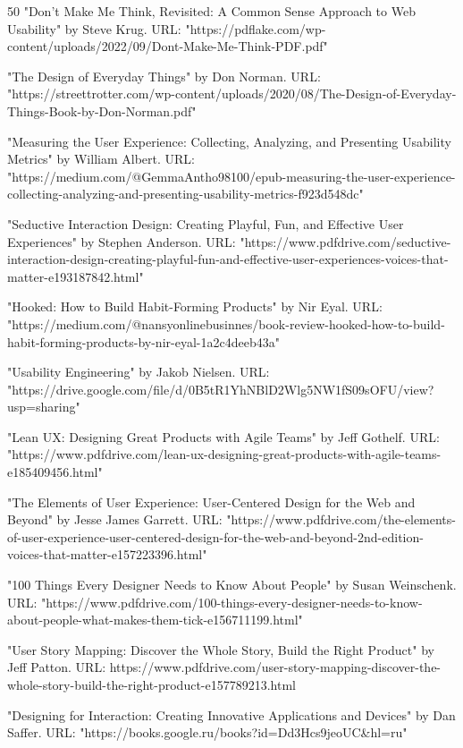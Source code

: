 \documentclass{article}
\begin{document}
\begin{thebibliography} {50}
"Don't Make Me Think, Revisited: A Common Sense Approach to Web Usability" by Steve Krug. URL:
"https://pdflake.com/wp-content/uploads/2022/09/Dont-Make-Me-Think-PDF.pdf"

"The Design of Everyday Things" by Don Norman. URL:
"https://streettrotter.com/wp-content/uploads/2020/08/The-Design-of-Everyday-Things-Book-by-Don-Norman.pdf"

"Measuring the User Experience: Collecting, Analyzing, and Presenting Usability Metrics" by William Albert. URL: "https://medium.com/@GemmaAntho98100/epub-measuring-the-user-experience-collecting-analyzing-and-presenting-usability-metrics-f923d548dc"

"Seductive Interaction Design: Creating Playful, Fun, and Effective User Experiences" by Stephen Anderson. URL: "https://www.pdfdrive.com/seductive-interaction-design-creating-playful-fun-and-effective-user-experiences-voices-that-matter-e193187842.html"

"Hooked: How to Build Habit-Forming Products" by Nir Eyal. URL: "https://medium.com/@nansyonlinebusinnes/book-review-hooked-how-to-build-habit-forming-products-by-nir-eyal-1a2c4deeb43a"

"Usability Engineering" by Jakob Nielsen. URL: "https://drive.google.com/file/d/0B5tR1YhNBlD2Wlg5NW1fS09sOFU/view?usp=sharing"

"Lean UX: Designing Great Products with Agile Teams" by Jeff Gothelf. URL:
"https://www.pdfdrive.com/lean-ux-designing-great-products-with-agile-teams-e185409456.html"

"The Elements of User Experience: User-Centered Design for the Web and Beyond" by Jesse James Garrett. URL: "https://www.pdfdrive.com/the-elements-of-user-experience-user-centered-design-for-the-web-and-beyond-2nd-edition-voices-that-matter-e157223396.html"

"100 Things Every Designer Needs to Know About People" by Susan Weinschenk. URL: "https://www.pdfdrive.com/100-things-every-designer-needs-to-know-about-people-what-makes-them-tick-e156711199.html"

"User Story Mapping: Discover the Whole Story, Build the Right Product" by Jeff Patton. URL: https://www.pdfdrive.com/user-story-mapping-discover-the-whole-story-build-the-right-product-e157789213.html

"Designing for Interaction: Creating Innovative Applications and Devices" by Dan Saffer. URL: "https://books.google.ru/books?id=Dd3Hcs9jeoUC&hl=ru"


\end{thebibliography}
\end{document}
